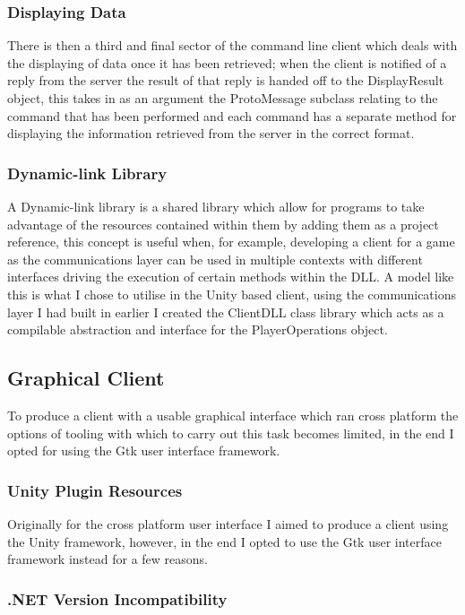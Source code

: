 \documentclass{article}
\begin{document}
\subsubsection{Displaying Data}
There is then a third and final sector of the command line client which deals with the displaying of data once it has been retrieved; when the client is notified of a reply from the server the result of that reply is handed off to the DisplayResult object, this takes in as an argument the ProtoMessage subclass relating to the command that has been performed and each command has a separate method for displaying the information retrieved from the server in the correct format.
\subsubsection{Dynamic-link Library}
A Dynamic-link library is a shared library which allow for programs to take advantage of the resources contained within them by adding them as a project reference, this concept is useful when, for example, developing a client for a game as the communications layer can be used in multiple contexts with different interfaces driving the execution of certain methods within the DLL. A model like this is what I chose to utilise in the Unity based client, using the communications layer I had built in earlier I created the ClientDLL class library which acts as a compilable abstraction and interface for the PlayerOperations object.
\subsection{Graphical Client}
To produce a client with a usable graphical interface which ran cross platform the options of tooling with which to carry out this task becomes limited, in the end I opted for using the Gtk user interface framework.

\subsubsection{Unity Plugin Resources}

Originally for the cross platform user interface I aimed to produce a client using the Unity framework, however, in the end I opted to use the Gtk user interface framework instead for a few reasons.

\subsubsection{.NET Version Incompatibility}
\end{document}
